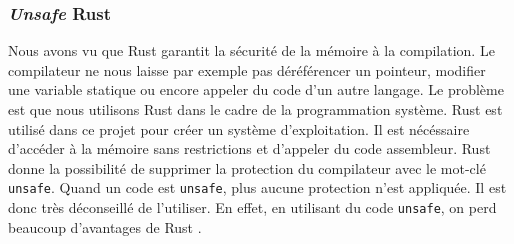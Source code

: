 \subsubsection{\textit{Unsafe} Rust}
Nous avons vu que Rust garantit la sécurité de la mémoire à la compilation.
Le compilateur ne nous laisse par exemple pas déréférencer un pointeur, modifier
une variable statique ou encore appeler du code d'un autre langage.
Le problème est que nous utilisons Rust dans le cadre de la programmation système.
Rust est utilisé dans ce projet pour créer un système d'exploitation. Il est nécéssaire
d'accéder à la mémoire sans restrictions et d'appeler du code assembleur. Rust donne
la possibilité de supprimer la protection du compilateur avec le mot-clé
\texttt{unsafe}. Quand un code est \texttt{unsafe}, plus aucune
protection n'est appliquée. Il est donc très déconseillé de l'utiliser. En effet,
en utilisant du code \texttt{unsafe}, on perd beaucoup d'avantages de Rust
\cite{ref2}.